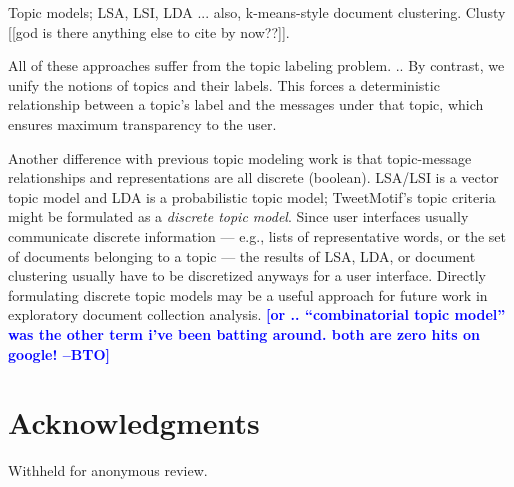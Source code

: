 \documentclass[letterpaper]{article}
\newcommand{\bto}[1]{\textcolor{blue}{\textbf{[#1 --BTO]}}}
\begin{document}
Topic models; LSA, LSI, LDA ... also, k-means-style document clustering.  Clusty [[god is there anything else to cite by now??]].

All of these approaches suffer from the topic labeling problem. ..  By contrast, we unify the notions of topics and their labels.  This forces a deterministic relationship between a topic's label and the messages under that topic, which ensures maximum transparency to the user.

Another difference with previous topic modeling work is that topic-message relationships and representations are all discrete (boolean).  LSA/LSI is a vector topic model and LDA is a probabilistic topic model; TweetMotif's topic criteria might be formulated as a \emph{discrete topic model}.  Since user interfaces usually communicate discrete information --- e.g., lists of representative words, or the set of documents belonging to a topic --- the results of LSA, LDA, or document clustering usually have to be discretized anyways for a user interface.  Directly formulating discrete topic models may be a useful approach for future work in exploratory document collection analysis.  \bto{or .. ``combinatorial topic model'' was the other term i've been batting around.  both are zero hits on google!}

\section{Acknowledgments}

Withheld for anonymous review.



\end{document}
